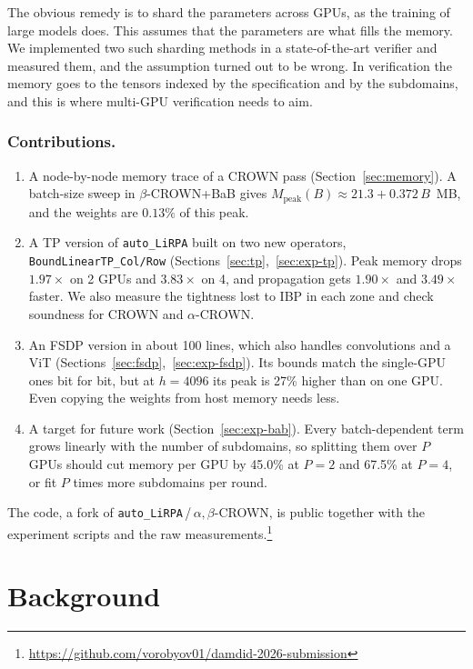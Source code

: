 \documentclass[runningheads]{llncs}
\begin{document}
The obvious remedy is to shard the parameters across GPUs, as the training of
large models does. This assumes that the parameters are what fills the memory.
We implemented two such sharding methods in a state-of-the-art verifier and
measured them, and the assumption turned out to be wrong. In verification the
memory goes to the tensors indexed by the specification and by the subdomains,
and this is where multi-GPU verification needs to aim.

\subsubsection{Contributions.}
\begin{enumerate}
\item A node-by-node memory trace of a CROWN pass (Section~\ref{sec:memory}).
  A batch-size sweep in $\beta$-CROWN{+}BaB gives
  $M_\text{peak}(B) \approx 21.3 + 0.372\,B$~MB, and the weights are $0.13\%$
  of this peak.
\item A TP version of \texttt{auto\_LiRPA} built on two new operators,
  \texttt{BoundLinearTP\_Col/Row} (Sections~\ref{sec:tp},~\ref{sec:exp-tp}).
  Peak memory drops $1.97\times$ on 2 GPUs and $3.83\times$ on 4, and
  propagation gets $1.90\times$ and $3.49\times$ faster. We also measure the
  tightness lost to IBP in each zone and check soundness for CROWN and
  $\alpha$-CROWN.
\item An FSDP version in about 100 lines, which also handles convolutions and a
  ViT (Sections~\ref{sec:fsdp},~\ref{sec:exp-fsdp}). Its bounds match the
  single-GPU ones bit for bit, but at $h{=}4096$ its peak is 27\% higher than
  on one GPU. Even copying the weights from host memory needs less.
\item A target for future work (Section~\ref{sec:exp-bab}). Every
  batch-dependent term grows linearly with the number of subdomains, so
  splitting them over $P$ GPUs should cut memory per GPU by 45.0\% at $P{=}2$
  and 67.5\% at $P{=}4$, or fit $P$ times more subdomains per round.
\end{enumerate}

The code, a fork of \texttt{auto\_LiRPA}\,/\,$\alpha,\beta$-CROWN, is public
together with the experiment scripts and the raw
measurements.\footnote{\url{https://github.com/vorobyov01/damdid-2026-submission}}

\section{Background}
\label{sec:verifiers}
\end{document}
